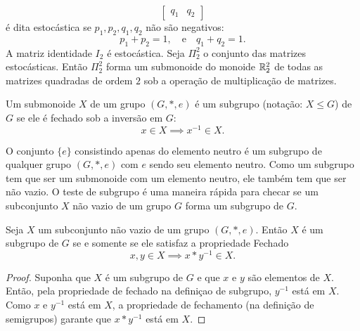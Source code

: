 \begin{definition}[Magma]
\begin{exmp}
$$\begin{bmatrix}
                  q_{1} & q_{2}
               \end{bmatrix}$$
            é dita estocástica se $p_{1},p_{2},q_{1},q_{2}$ não são negativos:
            $$p_{1} + p_{2} = 1,\quad \textrm{e}\quad q_{1} + q_{2} = 1.$$
            A matriz identidade $I_{2}$ é estocástica. Seja $\Pi_{2}^{2}$ o conjunto das matrizes estocásticas. Então $\Pi_{2}^{2}$ forma um submonoide do monoide $\mathbb{R}_{2}^{2}$ de todas as matrizes quadradas de ordem $2$ sob a operação de multiplicação de matrizes.
         \end{exmp}
         \begin{definition}[Subgrupos]
            Um submonoide $X$ de um grupo $(G,*,e)$ é um subgrupo (notação: $X \leq G$) de $G$ se ele é fechado sob a inversão em $G$:
            $$x\in X \implies x^{-1} \in X.$$
         \end{definition}
         O conjunto $\{e\}$ consistindo apenas do elemento neutro é um subgrupo de qualquer grupo $(G,*,e)$ com $e$ sendo seu elemento neutro. Como um subgrupo tem que ser um submonoide com um elemento neutro, ele também tem que ser não vazio. O teste de subgrupo é uma maneira rápida para checar se um subconjunto $X$ não vazio de um grupo $G$ forma um subgrupo de $G$.
         \begin{stat}
            Seja $X$ um subconjunto não vazio de um grupo $(G,*,e)$. Então $X$ é um subgrupo de $G$ se e somente se ele satisfaz a propriedade Fechado
            $$x,y \in X \implies x*y^{-1} \in X.$$
            \begin{proof}
               Suponha que $X$ é um subgrupo de $G$ e que $x$ e $y$ são elementos de $X$. Então, pela propriedade de fechado na definiçao de subgrupo, $y^{-1}$ está em $X$. Como $x$ e $y^{-1}$ está em $X$, a propriedade de fechamento (na definição de semigrupos) garante que $x*y^{-1}$ está em $X$.


\end{proof}
\end{stat}
\end{definition}
